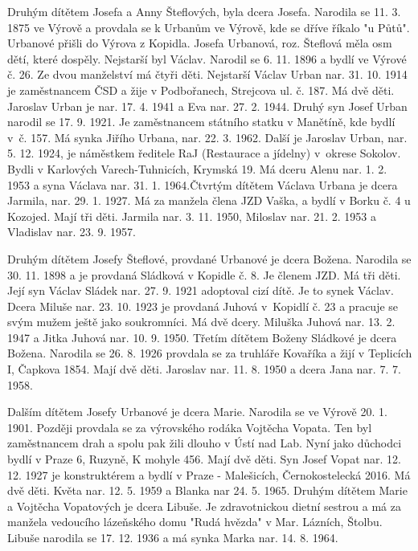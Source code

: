 \documentclass[../dejiny-rodu-prusiku.tex]{subfiles}
\begin{document}
Druhým dítětem Josefa a Anny Šteflových, byla dcera Josefa. Narodila se 11. 3. 1875 ve Výrově a provdala se k Urbanům ve Výrově, kde se dříve říkalo "u Půtů". Urbanové přišli do Výrova z Kopidla. Josefa Urbanová, roz. Šteflová měla osm dětí, které dospěly. Nejstarší byl Václav. Narodil se 6. 11. 1896 a bydlí ve Výrové č. 26. Ze dvou manželství má čtyři děti. Nejstarší Václav Urban nar. 31. 10. 1914 je zaměstnancem ČSD a žije v Podbořanech, Strejcova ul. č. 187. Má dvě děti. Jaroslav Urban je nar. 17. 4. 1941 a Eva nar. 27. 2. 1944. Druhý syn Josef Urban narodil se 17. 9. 1921. Je zaměstnancem státního statku v Manětíně, kde
bydlí v č. 157. Má synka Jiřího Urbana, nar. 22. 3. 1962. Další je Jaroslav Urban, nar. 5. 12. 1924, je náměstkem ředitele RaJ (Restaurace a jídelny) v okrese Sokolov. Bydli v Karlových Varech-Tuhnicích, Krymská 19. Má dceru Alenu nar. 1. 2. 1953 a syna Václava nar. 31. 1. 1964.Čtvrtým dítětem Václava Urbana je dcera Jarmila, nar. 29. 1. 1927. Má za manžela člena JZD Vaška, a bydlí v Borku č. 4 u Kozojed. Mají tři děti. Jarmila nar. 3. 11. 1950, Miloslav nar. 21. 2. 1953 a Vladislav nar. 23. 9. 1957.

Druhým dítětem Josefy Šteflové, provdané Urbanové je dcera Božena. Narodila se 30. 11. 1898 a je provdaná Sládková v Kopidle č. 8. Je členem JZD. Má tři děti. Její syn Václav Sládek nar. 27. 9. 1921 adoptoval cizí dítě. Je to synek Václav. Dcera Miluše  nar. 23. 10. 1923 je provdaná Juhová v Kopidlí č. 23 a pracuje se svým mužem ještě jako soukromníci. Má dvě dcery. Miluška Juhová nar. 13. 2. 1947 a Jitka Juhová nar. 10. 9. 1950. Třetím dítětem Boženy Sládkové je dcera Božena. Narodila se 26. 8. 1926 provdala se za truhláře Kovaříka a žijí v Teplicích I, Čapkova 1854. Mají dvě děti. Jaroslav nar. 11. 8. 1950 a dcera Jana nar. 7. 7. 1958.

Dalším dítětem Josefy Urbanové je dcera Marie. Narodila se ve Výrově 20. 1. 1901. Později provdala se za výrovského rodáka Vojtěcha Vopata. Ten byl zaměstnancem drah a spolu pak žili dlouho v Ústí nad Lab. Nyní jako důchodci bydlí v Praze 6, Ruzyně, K mohyle 456. Mají dvě děti. Syn Josef Vopat nar. 12. 12. 1927 je konstruktérem a bydlí v Praze - Malešicích, Černokostelecká 2016. Má dvě děti. Květa nar. 12. 5. 1959 a Blanka nar 24. 5. 1965. Druhým dítětem Marie a Vojtěcha Vopatových je dcera Libuše. Je zdravotnickou dietní sestrou a má za manžela vedoucího lázeňského domu "Rudá hvězda" v Mar. Lázních, Štolbu. Libuše narodila se 17. 12. 1936 a má synka Marka nar. 14. 8. 1964.
\end{document}
